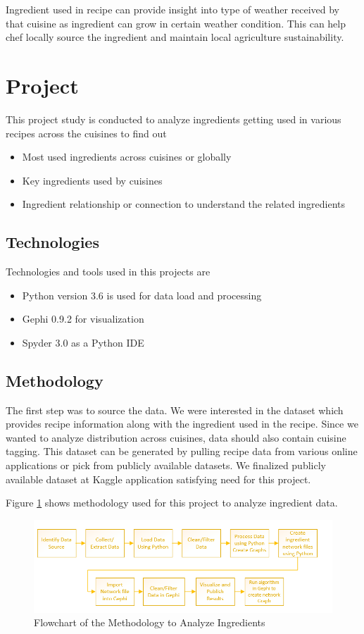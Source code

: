 \documentclass[sigconf]{acmart}
\begin{document}
Ingredient used in recipe can provide insight into type of weather received by that cuisine as ingredient can grow in certain weather condition. This can help chef locally source the ingredient and maintain local agriculture sustainability.

\section{Project}
This project study is conducted to analyze ingredients getting used in various recipes across the cuisines to find out
\begin{itemize}
\item Most used ingredients across cuisines or globally
\item Key ingredients used by cuisines
\item Ingredient relationship or connection to understand the related ingredients
\end{itemize}

\subsection{Technologies}
Technologies and tools used in this projects are
\begin{itemize}
\item Python version 3.6 is used for data load and processing
\item Gephi 0.9.2 for visualization
\item Spyder 3.0 as a Python IDE
\end{itemize}

\subsection{Methodology}
The first step was to source the data. We were interested in the dataset which provides recipe information along with the ingredient used in the recipe. Since we wanted to analyze distribution across cuisines, data should also contain cuisine tagging. This dataset can be generated by pulling recipe data from various online applications or pick from publicly available datasets. We finalized publicly available dataset at Kaggle application satisfying need for this project.

Figure \ref{f:methodology} shows methodology used for this project to analyze ingredient data.
\begin{figure}[!ht]
  \centering\includegraphics[width=\columnwidth]{images/methodology.PNG}
  \caption{Flowchart of the Methodology to Analyze Ingredients }\label{f:methodology}
\end{figure}
\end{document}
